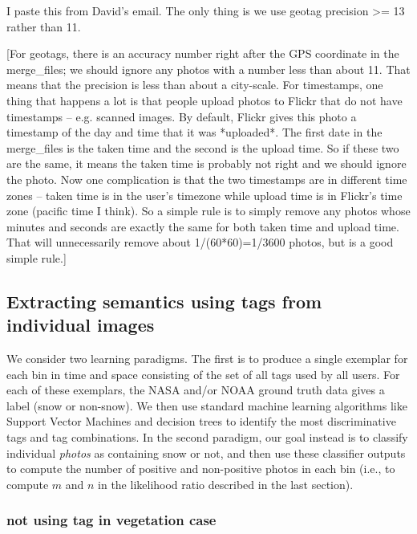 \documentclass[10pt,journal,compsoc]{IEEEtran}
\begin{document}
I paste this from David's email. The only thing is we use geotag precision >= 13 rather than 11. 

[For geotags, there is an
accuracy number right after the GPS coordinate in the merge\_files; we
should ignore any photos with a number less than about 11. That means
that the precision is less than about a city-scale. For timestamps,
one thing that happens a lot is that people upload photos to Flickr
that do not have timestamps -- e.g. scanned images. By default, Flickr
gives this photo a timestamp of the day and time that it was
*uploaded*. The first date in the merge\_files is the taken time and
the second is the upload time. So if these two are the same, it means
the taken time is probably not right and we should ignore the photo.
Now one complication is that the two timestamps are in different time
zones -- taken time is in the user's timezone while upload time is in
Flickr's time zone (pacific time I think). So a simple rule is to
simply remove any photos whose minutes and seconds are exactly the
same for both taken time and upload time. That will unnecessarily
remove about 1/(60*60)=1/3600 photos, but is a good simple rule.]




\subsection{Extracting semantics using tags from individual images}

We consider two learning paradigms. The first
is to produce a single exemplar for each bin in time and space
consisting of the set of all tags used by all users. For each of these
exemplars, the NASA and/or NOAA ground truth data gives a label (snow
or non-snow). We then use standard machine learning algorithms like
Support Vector Machines and decision trees to identify the most
discriminative tags and tag combinations. In the second paradigm, our
goal instead is to classify individual \textit{photos} as containing
snow or not, and then use these classifier outputs to compute the
number of positive and non-positive photos in each bin (i.e., to
compute $m$ and $n$ in the likelihood ratio described in the last
section).





\subsubsection{not using tag in vegetation case}
\end{document}
